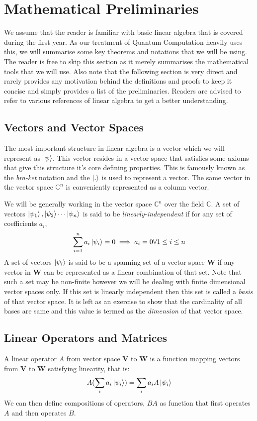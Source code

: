 \section{Mathematical Preliminaries}

We assume that the reader is familiar with basic linear algebra that is covered during the first year. As our treatment of Quantum Computation heavily uses this, we will summarise some key theorems and notations that we will be using. The reader is free to skip this section as it merely summarises the mathematical tools that we will use. Also note that the following section is very direct and rarely provides any motivation behind the definitions and proofs to keep it concise and simply provides a list of the preliminaries. Readers are advised to refer to various references of linear algebra to get a better understanding.

\subsection{Vectors and Vector Spaces}
The most important structure in linear algebra is a vector which we will represent as $\ket{\psi}$. This vector resides in a vector space that satisfies some axioms that give this structure it's core defining properties. This is famously known as the \textit{bra-ket} notation and the $\ket{.}$ is used to represent a vector. The same vector in the vector space $\mathbb{C}^{n}$ is conveniently represented as a column vector.

We will be generally working in the vector space $\mathbb{C}^{n}$ over the field $\mathbb{C}$.
A set of vectors $\ket{\psi_{1}}, \ket{\psi_{2}} \cdots \ket{\psi_{n}}$ is said to be \textit{linearly-independent} if for any set of coefficients ${a_i}$, 
$$\sum_{i=1}^{n} a_i\ket{\psi_{i}} = 0 \implies a_i = 0   \forall   1 \leq i \leq n$$
A set of vectors ${\ket{\psi_{i}}}$ is said to be a spanning set of a vector space $\textbf{W}$ if any vector in $\textbf{W}$ can be represented as a linear combination of that set. Note that such a set may be non-finite however we will be dealing with finite dimensional vector spaces only. If this set is linearly independent then this set is called a \textit{basis} of that vector space. It is left as an exercise to show that the cardinality of all bases are same and this value is termed as the \textit{dimension} of that vector space.

\subsection{Linear Operators and Matrices}
A linear operator $A$ from vector space \textbf{V} to \textbf{W} is a function mapping vectors from \textbf{V} to \textbf{W} satisfying linearity, that is:
$$ A(\sum_{i} a_i \ket{\psi_{i}}) = \sum_{i} a_{i}A\ket{\psi_{i}} $$ 
We can then define compositions of operators, $BA$ as function that first operates $A$ and then operates $B$. 

